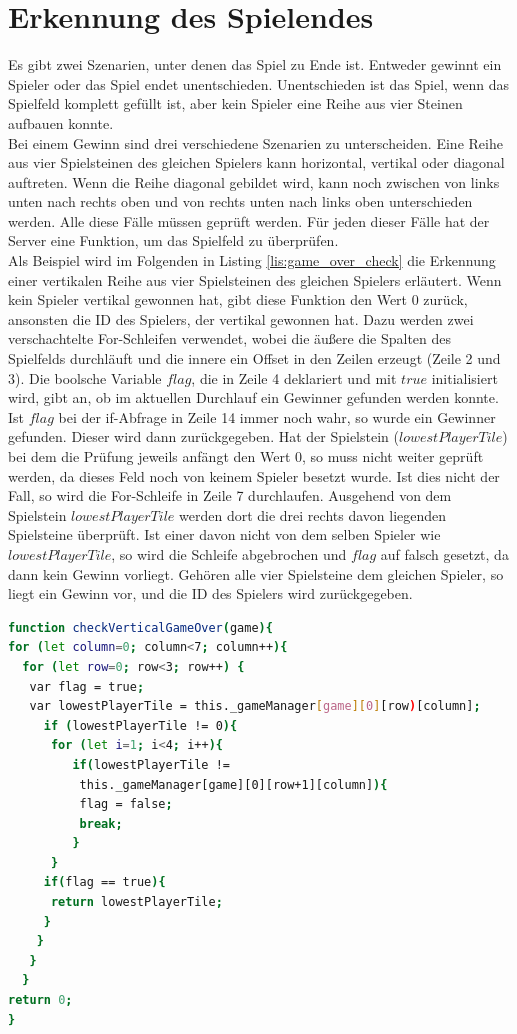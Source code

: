 \section{Erkennung des Spielendes}\label{sec:GameOver}
Es gibt zwei Szenarien, unter denen das Spiel zu Ende ist. Entweder gewinnt ein Spieler oder das Spiel endet unentschieden. Unentschieden ist das Spiel, wenn das Spielfeld komplett gefüllt ist, aber kein Spieler eine Reihe aus vier Steinen aufbauen konnte.\\
Bei einem Gewinn sind drei verschiedene Szenarien zu unterscheiden. Eine Reihe aus vier Spielsteinen des gleichen Spielers kann horizontal, vertikal oder diagonal auftreten. Wenn die Reihe diagonal gebildet wird, kann noch zwischen von links unten nach rechts oben und von rechts unten nach links oben unterschieden werden. Alle diese Fälle müssen geprüft werden. Für jeden dieser Fälle hat der Server eine Funktion, um das Spielfeld zu überprüfen.\\
Als Beispiel wird im Folgenden in Listing \ref{lis:game_over_check} die Erkennung einer vertikalen Reihe aus vier Spielsteinen des gleichen Spielers erläutert. Wenn kein Spieler vertikal gewonnen hat, gibt diese Funktion den Wert $0$ zurück, ansonsten die ID des Spielers, der vertikal gewonnen hat. Dazu werden zwei verschachtelte For-Schleifen verwendet, wobei die äußere die Spalten des Spielfelds durchläuft und die innere ein Offset in den Zeilen erzeugt (Zeile 2 und 3). Die boolsche Variable $flag$, die in Zeile 4 deklariert und mit $true$ initialisiert wird, gibt an, ob im aktuellen Durchlauf ein Gewinner gefunden werden konnte. Ist $flag$ bei der if-Abfrage in Zeile 14 immer noch wahr, so wurde ein Gewinner gefunden. Dieser wird dann zurückgegeben. Hat der Spielstein ($lowestPlayerTile$) bei dem die Prüfung jeweils anfängt den Wert $0$, so muss nicht weiter geprüft werden, da dieses Feld noch von keinem Spieler besetzt wurde. Ist dies nicht der Fall, so wird die For-Schleife in Zeile 7 durchlaufen. Ausgehend von dem Spielstein $lowestPlayerTile$ werden dort die drei rechts davon liegenden Spielsteine überprüft. Ist einer davon nicht von dem selben Spieler wie $lowestPlayerTile$, so wird die Schleife abgebrochen und $flag$ auf falsch gesetzt, da dann kein Gewinn vorliegt. Gehören alle vier Spielsteine dem gleichen Spieler, so liegt ein Gewinn vor, und die ID des Spielers wird zurückgegeben.
\begin{lstlisting}[language=bash, caption={Vertikale Game-Over Überprüfung}, label=lis:game_over_check]
function checkVerticalGameOver(game){
for (let column=0; column<7; column++){
  for (let row=0; row<3; row++) {
   var flag = true;
   var lowestPlayerTile = this._gameManager[game][0][row)[column];
     if (lowestPlayerTile != 0){
      for (let i=1; i<4; i++){
	     if(lowestPlayerTile !=
	      this._gameManager[game][0][row+1][column]){
	      flag = false;
	      break;
         }
      }
     if(flag == true){
      return lowestPlayerTile;
     }
    }
   }
  }
return 0;
}
\end{lstlisting}
